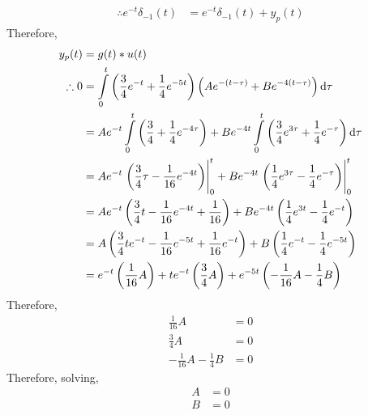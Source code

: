 \documentclass[fleqn, a4paper, 11pt, oneside]{amsart}
\theoremstyle{definition}
\theoremstyle{theorem}
\begin{document}
\begin{solution}
\begin{enumerate}[leftmargin=*]
\begin{align*}
				\therefore e^{-t} \delta_{-1}(t) & = e^{-t} \delta_{-1}(t) + y_p(t)
			\end{align*}
			Therefore,
			\begin{align*}
				y_p(t)       & = g(t) \ast u(t)                                                                                                                                                                             \\
				\therefore 0 & = \int\limits_{0}^{t} \left( \frac{3}{4} e^{-t} + \frac{1}{4} e^{-5 t} \right) \left( A e^{-(t - \tau)} + B e^{-4 (t - \tau)} \right) \dif \tau                                              \\
                                             & = A e^{-t} \int\limits_{0}^{t} \left( \frac{3}{4} + \frac{1}{4} e^{-4 \tau} \right) + B e^{-4 t} \int\limits_{0}^{t} \left( \frac{3}{4} e^{3 \tau} + \frac{1}{4} e^{-\tau} \right) \dif \tau \\
                                             & = A e^{-t} \left. \left( \frac{3}{4} \tau - \frac{1}{16} e^{-4 t} \right) \right|_{0}^{t} + B e^{-4 t} \left. \left( \frac{1}{4} e^{3 \tau} - \frac{1}{4} e^{- \tau} \right) \right|_{0}^{t} \\
                                             & = A e^{-t} \left( \frac{3}{4} t - \frac{1}{16} e^{-4 t} + \frac{1}{16} \right) + B e^{-4 t} \left( \frac{1}{4} e^{3 t} - \frac{1}{4} e^{-t} \right)                                          \\
                                             & = A \left( \frac{3}{4} t e^{-t} - \frac{1}{16} e^{-5 t} + \frac{1}{16} e^{-t} \right) + B \left( \frac{1}{4} e^{-t} - \frac{1}{4} e^{-5 t} \right)                                           \\
                                             & = e^{-t} \left( \frac{1}{16} A \right) + t e^{-t} \left( \frac{3}{4} A \right) + e^{-5 t} \left( -\frac{1}{16} A - \frac{1}{4} B \right)
			\end{align*}
			Therefore,
			\begin{align*}
				\frac{1}{16} A                  & = 0 \\
				\frac{3}{4} A                   & = 0 \\
				-\frac{1}{16} A - \frac{1}{4} B & = 0
			\end{align*}
			Therefore, solving,
			\begin{align*}
				A & = 0 \\
				B & = 0
			\end{align*}
	\end{enumerate}
\end{solution}
\end{document}
